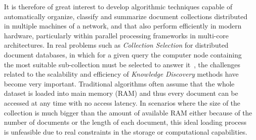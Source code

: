 \documentclass[10pt]{article}
\begin{document}
It is therefore of great interest to develop algorithmic techniques capable of automatically organize, classify and summarize document collections distributed in multiple machines of a network, and that also perform efficiently in modern hardware, particularly within parallel processing frameworks in multi-core architectures. In real problems such as \textit{Collection Selection} for distributed document databases, in which for a given query the computer node containing the most suitable
sub-collection must be selected to answer it~\cite{CM13}, the challenges related to the scalability and efficiency of \textit{Knowledge Discovery} methods have become very important. Traditional algorithms often assume that the whole dataset is loaded into main memory (RAM) and thus every document can be accessed at any time with no access latency. In scenarios where the size of the collection is much bigger than the amount of available RAM either because of the number of documents or the length of each document, this ideal loading process is unfeasible due to real constraints in the storage or computational capabilities.
\end{document}
